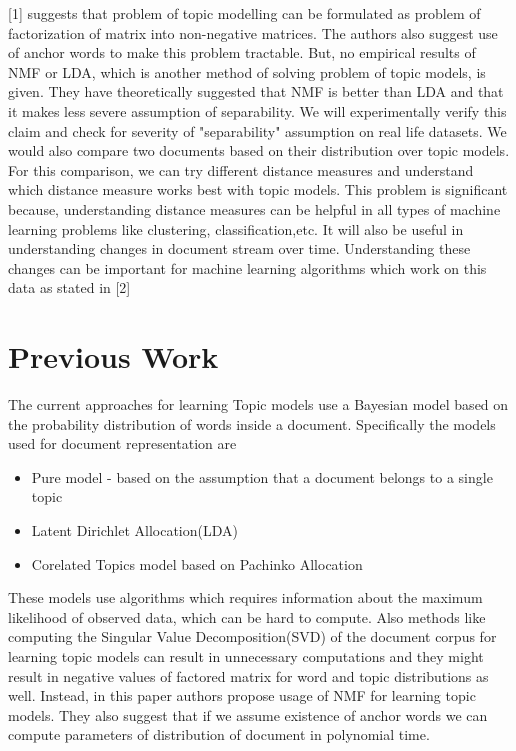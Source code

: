 \documentclass[a4paper,11pt]{article}
\begin{document}
[1] suggests that problem of topic modelling can be formulated as problem of factorization of matrix into non-negative matrices. The authors also suggest use of anchor words to make this problem tractable. But, no empirical results of NMF or LDA, which is another method of solving problem of topic models, is given. They have theoretically suggested that NMF is better than LDA and that it makes less severe assumption of separability. We will experimentally verify this claim and check for severity of "separability" assumption on real life datasets. We would also compare two documents based on their distribution over topic models. For this comparison, we can try different distance measures and understand which distance measure works best with topic models. This problem is significant because, understanding distance measures can be helpful in all types of machine learning problems like clustering, classification,etc. It will also be useful in understanding changes in document stream over time. Understanding these changes can be important for machine learning algorithms which work on this data as stated in [2]

\section{Previous Work}

The current approaches for learning Topic models use a Bayesian model based on the probability distribution of words inside a document{\cite{blei}}. Specifically the models used for document representation are

\begin{itemize} 
\item Pure model - based on the assumption that a document belongs to a single topic
\item Latent Dirichlet Allocation(LDA)
\item Corelated Topics model based on Pachinko Allocation
\end{itemize}

These models use algorithms which requires information about the maximum likelihood of observed data, which can be hard to compute. Also methods like computing the Singular Value Decomposition(SVD) of the document corpus for learning topic models can result in unnecessary computations and they might result in negative values of factored matrix for word and topic distributions as well. Instead, in this paper authors propose usage of NMF for learning topic models. They also suggest that if we assume existence of anchor words we can compute parameters of distribution of document in polynomial time. 
\end{document}
